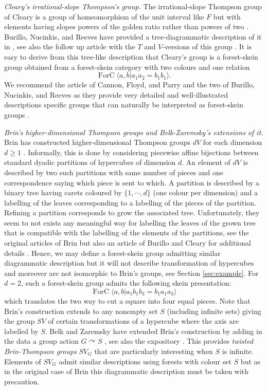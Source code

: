 \documentclass[a4paper, 12pt]{amsart}
\numberwithin{equation}{section}
\theoremstyle{definition}
\newcommand{\act}{\curvearrowright}
\DeclareMathOperator{\FC}{ForC}
\newcommand{\la}{\langle}
\newcommand{\ra}{\rangle}
\begin{document}
{\it Cleary's irrational-slope Thompson's group.}
The irrational-slope Thompson group of Cleary is a group of homeomorphism of the unit interval like $F$ but with elements having slopes powers of the golden ratio rather than powers of two \cite{Cleary00}.
Burillo, Nucinkis, and Reeves have provided a tree-diagrammatic description of it in \cite{Burillo-Nucinkis-Reeves21}, see also the follow up article with the $T$ and $V$-versions of this group \cite{Burillo-Nucinkis-Reeves22}.
It is easy to derive from this tree-like description that Cleary's group is a forest-skein group obtained from a forest-skein category with two colours and one relation
$$\FC\la a,b| a_1a_2=b_1b_1\ra.$$
We recommend the article of Cannon, Floyd, and Parry and the two of Burillo, Nucinkis, and Reeves as they provide very detailed and well-illustrated descriptions specific groups that can naturally be interpreted as forest-skein groups \cite{Cannon-Floyd-Parry96,Burillo-Nucinkis-Reeves21,Burillo-Nucinkis-Reeves22}.

{\it Brin's higher-dimensional Thompson groups and Belk-Zaremsky's extensions of it.}
Brin has constructed higher-dimensional Thompson groups $dV$ for each dimension $d\geq 1$ \cite{Brin-dV1,Brin-dV2}.
Informally, this is done by considering piecewise affine bijections between standard dyadic partitions of hypercubes of dimension $d$.
An element of $dV$ is described by two such partitions with same number of pieces and one correspondence saying which piece is sent to which.
A partition is described by a binary tree having carets coloured by $\{1,\cdots, d\}$ (one colour per dimension) and a labelling of the leaves corresponding to a labelling of the pieces of the partition.
Refining a partition corresponds to grow the associated tree. Unfortunately, they seem to not exists any meaningful way for labelling the leaves of the grown tree that is compatible with the labelling of the elements of the partitions, see the original articles of Brin but also an article of Burillo and Cleary for additional details \cite{Burillo-Cleary10}.
Hence, we may define a forest-skein group admitting similar diagrammatic description but it will not describe transformation of hypercubes and moreover are not isomorphic to Brin's groups, see Section \ref{sec:example}.
For $d=2$, such a forest-skein group admits the following skein presentation:
$$\FC\la a,b| a_1 b_1b_3=b_1a_1a_3\ra$$
which translates the two way to cut a square into four equal pieces. 
Note that Brin's construction extends to any nonempty set $S$ (including infinite sets) giving the group $SV$ of certain transformations of a hypercube where the axis are labelled by $S$.
Belk and Zaremsky have extended Brin's construction by adding in the data a group action $G\act S$ \cite{Belk-Zaremsky22}, see also the expository \cite{Zaremsky22}.
This provides {\it twisted Brin-Thompson groups} $SV_G$ that are particularly interesting when $S$ is infinite. 
Elements of $SV_G$ admit similar descriptions using forests with colour set $S$ but as in the original case of Brin this diagrammatic description must be taken with precaution.
\end{document}
